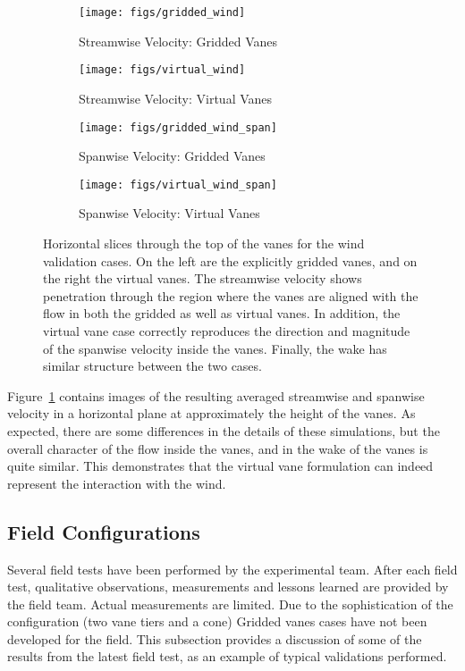\begin{figure}[htb]

 \begin{subfigure}{.5\textwidth}
  \centering
  \texttt{[image: figs/gridded\_wind]}
  \caption{Streamwise Velocity: Gridded Vanes}
 \end{subfigure}%
 \begin{subfigure}{.5\textwidth}
  \centering
  \texttt{[image: figs/virtual\_wind]}
  \caption{Streamwise Velocity: Virtual Vanes}
 \end{subfigure}%


 \begin{subfigure}{.5\textwidth}
  \centering
  \texttt{[image: figs/gridded\_wind\_span]}
  \caption{Spanwise Velocity: Gridded Vanes}
 \end{subfigure}%
 \begin{subfigure}{.5\textwidth}
  \centering
  \texttt{[image: figs/virtual\_wind\_span]}
  \caption{Spanwise Velocity: Virtual Vanes}
 \end{subfigure}%

 \caption{Horizontal slices through the top of the vanes for the
 wind validation cases. On the left are the explicitly gridded vanes,
 and on the right the virtual vanes. The streamwise velocity shows
 penetration through the region where the vanes are aligned with the
 flow in both the gridded as well as virtual vanes. In addition, the
 virtual vane case correctly reproduces the direction and magnitude of
 the spanwise velocity inside the vanes. Finally, the wake has similar
 structure between the two cases.}
 \label{fig:wind_val}
\end{figure}

Figure~\ref{fig:wind_val} contains images of the resulting averaged
streamwise and  spanwise velocity in a horizontal plane at approximately
the height of the vanes. As expected, there are some differences in the
details of these simulations, but the overall character of the flow
inside the vanes, and in the wake of the vanes is quite similar. This
demonstrates that the virtual vane formulation can indeed represent the
interaction with the wind. 

\subsection{Field Configurations}

Several field tests have been performed by the experimental team. After
each field test, qualitative observations, measurements and lessons
learned are provided by the field team. Actual measurements
are limited. Due to the sophistication of the configuration
(two vane tiers and a cone) Gridded vanes cases have not been developed
for the field. This subsection provides a discussion of some of
the results from the latest field test, as an example of typical
validations performed. 

